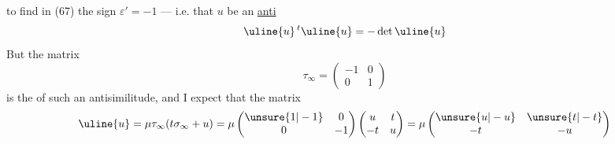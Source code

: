 to find in (67) the sign $\varepsilon'=-1$ --- i.e. that
$u$ be an \uline{anti}
\[
\uline{u}\,{}^t\uline{u}=-\det\uline{u}
\]
But  the matrix
\[
\tau_\infty=\begin{pmatrix}-1&0\\0&1\end{pmatrix}
\]
is the  of such an antisimilitude, and I
expect that the matrix
\[
\uline{u}=\mu\tau_\infty(t\sigma_\infty+u)
=\mu\begin{pmatrix}\unsure{1|-1}&0\\0&-1\end{pmatrix}
\begin{pmatrix}u&t\\-t&u\end{pmatrix}
=\mu\begin{pmatrix}\unsure{u|-u}&\unsure{t|-t}\\-t&-u\end{pmatrix}
\]


